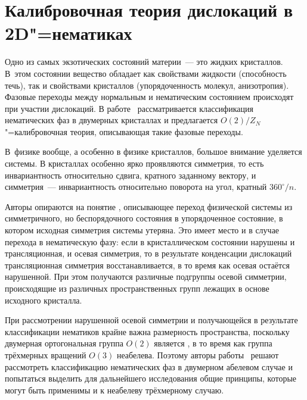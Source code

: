 \documentclass[a4paper, 14pt, titlepage]{extarticle}
\begin{document}

  \section{Калибровочная теория дислокаций в 2D"=нематиках}

  Одно из самых экзотических состояний материи~--- это  жидких кристаллов.
  В~этом состоянии вещество обладает как свойствами жидкости (способность течь), так и свойствами
  кристаллов (упорядоченность молекул, анизотропия). Фазовые переходы между нормальным и
  нематическим состоянием происходят при участии дислокаций. В работе~\cite{liu-nematic}
  рассматривается классификация нематических фаз в двумерных кристаллах и предлагается
  $O(2)/Z_N$"=калибровочная теория, описывающая такие фазовые переходы.

  В~физике вообще, а особенно в физике кристаллов, большое внимание уделяется 
  системы. В кристаллах особенно ярко проявляются  симметрия, то есть
  инвариантность относительно сдвига, кратного заданному вектору, и  симметрия~---
  инвариантность относительно поворота на угол, кратный $360^\circ/n$.

  Авторы опираются на понятие , описывающее переход физической
  системы из симметричного, но беспорядочного состояния в упорядоченное состояние, в котором
  исходная симметрия системы утеряна. Это имеет место и в случае перехода в нематическую фазу: если
  в кристаллическом состоянии нарушены и трансляционная, и осевая симметрия, то в результате
  конденсации дислокаций трансляционная симметрия восстанавливается, в то время как осевая остаётся
  нарушенной. При этом получаются различные подгруппы осевой симметрии, происходящие из различных
  пространственных групп лежащих в основе исходного кристалла.

  При рассмотрении нарушенной осевой симметрии и получающейся в результате классификации нематиков
  крайне важна размерность пространства, поскольку двумерная ортогональная группа $O(2)$ является
  , в то время как группа трёхмерных вращений $O(3)$ неабелева. Поэтому авторы
  работы~\cite{liu-nematic} решают рассмотреть классификацию нематических фаз в двумерном абелевом
  случае и попытаться выделить для дальнейшего исследования общие принципы, которые могут быть
  применимы и к неабелеву трёхмерному случаю.
\end{document}
